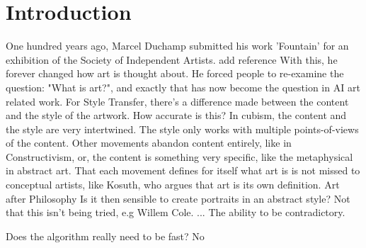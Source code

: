 \chapter*{Introduction}
\label{chap:intro}

One hundred years ago, Marcel Duchamp submitted his work 'Fountain' for an exhibition of the Society of Independent Artists. {add reference}
With this, he forever changed how art is thought about. He forced people to re-examine the question: "What is art?", and exactly that has now become the question in AI art related work.
For Style Transfer, there's a difference made between the content and the style of the artwork. How accurate is this?
In cubism, the content and the style are very intertwined. The style only works with multiple points-of-views of the content.
Other movements abandon content entirely, like in Constructivism, or, the content is something very specific, like the metaphysical in abstract art.
That each movement defines for itself what art is is not missed to conceptual artists, like Kosuth, who argues that art is its own definition. {Art after Philosophy}
Is it then sensible to create portraits in an abstract style? Not that this isn't being tried, e.g Willem Cole.
...
The ability to be contradictory.

Does the algorithm really need to be fast? No
